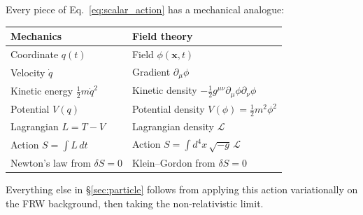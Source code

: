 \documentclass[12pt]{article}
\begin{document}
Every piece of Eq.~\eqref{eq:scalar_action} has a mechanical analogue:
%
\begin{center}
\begin{tabular}{@{}ll@{}}
\toprule
Mechanics                          & Field theory \\
\midrule
Coordinate $q(t)$                  & Field $\phi(\mathbf x, t)$ \\
Velocity $\dot q$                  & Gradient $\partial_\mu\phi$ \\
Kinetic energy $\tfrac{1}{2}m\dot q^2$ & Kinetic density
                                     $-\tfrac{1}{2}g^{\mu\nu}\partial_\mu\phi\partial_\nu\phi$ \\
Potential $V(q)$                   & Potential density $V(\phi)=\tfrac{1}{2}m^2\phi^2$ \\
Lagrangian $L = T - V$             & Lagrangian density $\mathcal L$ \\
Action $S=\int L\,dt$              & Action $S = \int d^4x\,\sqrt{-g}\,\mathcal L$ \\
Newton's law from $\delta S=0$     & Klein--Gordon from $\delta S=0$ \\
\bottomrule
\end{tabular}
\end{center}

Everything else in \S\ref{sec:particle} follows from applying this
action variationally on the FRW background, then taking the
non-relativistic limit.


\end{document}
